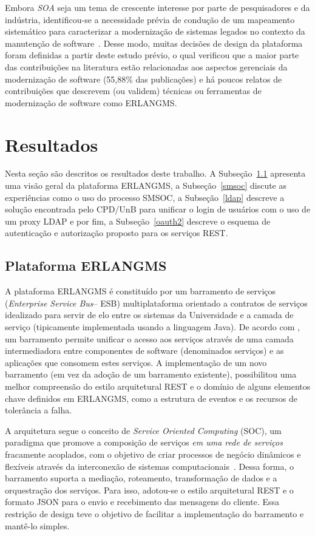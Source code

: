 \documentclass[12pt]{article}
\begin{document}
Embora \emph{SOA} seja um tema
de crescente interesse por parte de pesquisadores e da indústria, identificou-se 
a necessidade prévia de condução de um mapeamento sistemático para 
caracterizar a modernização de sistemas legados no 
contexto da manutenção de software~\cite{desystematic2016}. 
Desse modo, muitas decisões de design da plataforma
foram definidas a partir deste estudo prévio, o qual verificou
que a maior parte das contribuições na literatura
estão relacionadas aos aspectos gerenciais da modernização de software (55,88\% das
publicações) e há poucos relatos de contribuições que descrevem (ou validem)
técnicas ou ferramentas de modernização de software como ERLANGMS.


\section{Resultados}

Nesta seção são descritos os resultados deste trabalho. A Subseção~\ref{plataforma}
apresenta uma visão geral da plataforma ERLANGMS, a Subseção~\ref{smsoc}
discute as experiências como o uso do processo SMSOC, a Subseção~\ref{ldap}
descreve a solução encontrada pelo CPD/UnB para unificar
o login de usuários com o uso de um proxy LDAP e por fim, 
a Subseção~\ref{oauth2}
descreve o esquema de autenticação e autorização proposto 
para os serviços REST.


\subsection{Plataforma ERLANGMS}\label{plataforma}

A plataforma ERLANGMS é constituído 
por um barramento de serviços (\textit{Enterprise Service Bus}-- ESB) 
multiplataforma orientado a contratos de serviços
idealizado para servir de elo entre os 
sistemas da Universidade e a camada de serviço (tipicamente 
implementada usando a linguagem Java). 
De acordo com \cite{ModelDriApproRest:2014}, 
um barramento permite unificar o acesso aos serviços 
através de uma camada intermediadora entre componentes de software (denominados serviços) e 
as aplicações que consomem estes serviços. 
A implementa\c c\~{a}o 
de um novo barramento (em vez da ado\c c\~{a}o de um barramento existente), 
possibilitou uma melhor compreens\~{a}o do estilo arquitetural REST e o dom\'{i}nio de alguns 
elementos chave definidos em ERLANGMS, como a estrutura de eventos
e os recursos de toler\^{a}ncia a falha. 

A arquitetura segue o conceito de \textit{Service Oriented Computing} (SOC), 
um paradigma que promove a composição de serviços \emph{em uma rede de serviços} 
fracamente acoplados, com o objetivo de criar processos de negócio dinâmicos 
e flexíveis através da interconexão de sistemas computacionais~\cite{ModelDriApproRest:2014}. 
Dessa forma, o barramento suporta a mediação, roteamento, 
transformação de dados e a orquestração dos serviços. Para isso, adotou-se o 
estilo arquitetural REST e o formato JSON para o envio e 
recebimento das mensagens do cliente. Essa restrição de design teve o 
objetivo de facilitar a implementação do barramento e mantê-lo simples. 
\end{document}
